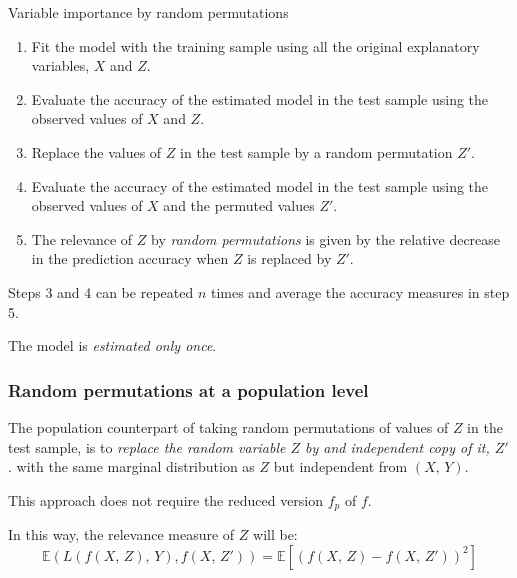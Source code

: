 \begin{algorithm}{Variable importance by random permutations}{}
    \begin{enumerate}
        \item Fit the model with the training sample using all the original
            explanatory variables, $X$ and $Z$.
        \item Evaluate the accuracy of the estimated model in the test sample using the observed values of
            $X$ and $Z$.
        \item Replace the values of $Z$ in the test sample by a random permutation
            $Z'$.
        \item Evaluate the accuracy of the estimated model in the test sample using the observed values of $X$
            and the permuted values $Z'$.
        \item The relevance of $Z$ by \emph{random permutations} is given by the relative
            decrease in the prediction accuracy when $Z$ is replaced by $Z'$.
    \end{enumerate}
    \tcblower
    \begin{note}
        Steps 3 and 4 can be repeated $n$ times and average the accuracy measures in step 5.
    \end{note}
    \begin{note}
        The model is \emph{estimated only once}.
    \end{note}
\end{algorithm}

\subsubsection{Random permutations at a population level}

The population counterpart of taking random permutations of values
of $Z$ in the test sample, is to \emph{replace the random variable $Z$ by and independent
copy of it, $Z'$}. with the same marginal distribution as
$Z$ but independent from $(X,\,Y)$.

This approach does not require the reduced version $f_p$ of $f$.

In this way, the relevance measure of $Z$ will be:
\begin{equation*}
    \mathds{E}(L(f(X,\,Z),\,Y),f(X,\,Z')) = \mathds{E} \left[ (f(X,\,Z) - f(X,\,Z'))^2 \right]
\end{equation*}

